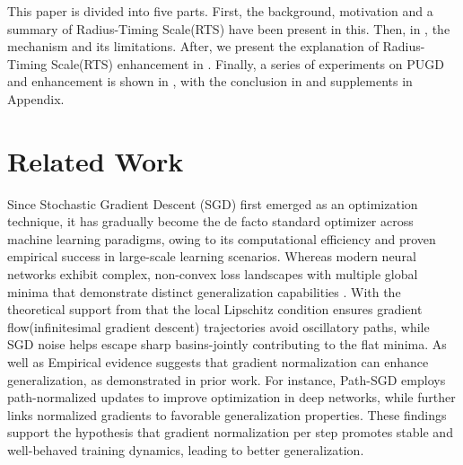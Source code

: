 \documentclass[10pt,twocolumn,letterpaper]{article}
\begin{document}
This paper is divided into five parts. First, the background, motivation and a summary of Radius-Timing Scale(RTS) have been present in this. Then, in , the mechanism and its limitations. After, we present the explanation of Radius-Timing Scale(RTS) enhancement in . Finally, a series of experiments on PUGD and enhancement is shown in , with the conclusion in  and supplements in Appendix. 

\section{Related Work}
\label{sec:2}
Since Stochastic Gradient Descent (SGD) \cite{4308316} first emerged as an optimization technique, it has gradually become the de facto standard optimizer across machine learning paradigms, owing to its computational efficiency and proven empirical success in large-scale learning scenarios.
Whereas modern neural networks exhibit complex, non-convex loss landscapes with multiple global minima that demonstrate distinct generalization capabilities \cite{keskar2017largebatchtrainingdeeplearning}. With the theoretical support from \cite{ji2020directionalconvergencealignmentdeep} that the local Lipschitz condition ensures gradient flow(infinitesimal gradient descent) trajectories avoid oscillatory paths, while SGD noise helps escape sharp basins-jointly contributing to the flat minima. As well as Empirical evidence suggests that gradient normalization can enhance generalization, as demonstrated in prior work. For instance, Path-SGD \cite{neyshabur2015pathsgdpathnormalizedoptimizationdeep} employs path-normalized updates to improve optimization in deep networks, while \cite{jiang2019fantasticgeneralizationmeasures, jastrzebski2020breakevenpointoptimizationtrajectories} further links normalized gradients to favorable generalization properties. These findings support the hypothesis that gradient normalization per step promotes stable and well-behaved training dynamics, leading to better generalization. 
\end{document}
